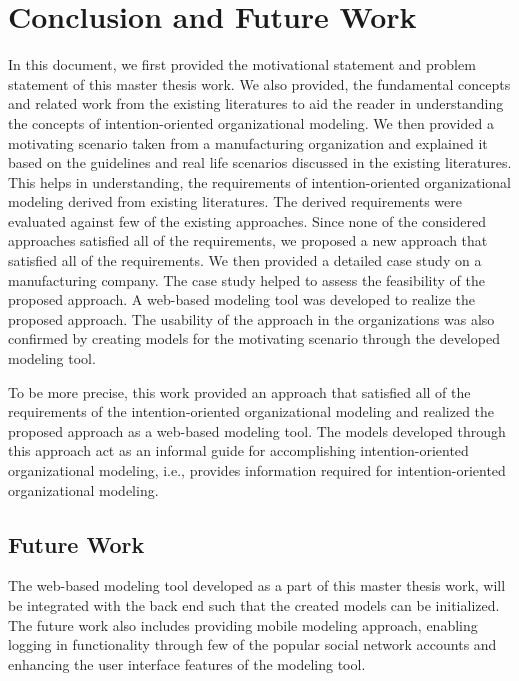 \chapter{Conclusion and Future Work}
\label{chap:conclusion}

In this document, we first provided the motivational statement and problem statement of this master thesis work. We also provided, the fundamental concepts and related work from the existing literatures to aid the reader in understanding the concepts of intention-oriented organizational modeling. We then provided a motivating scenario taken from a manufacturing organization and explained it based on the guidelines and real life scenarios discussed in the existing literatures. This helps in understanding, the requirements of intention-oriented organizational modeling derived from existing literatures. The derived requirements were evaluated against few of the existing approaches. Since none of the considered approaches satisfied all of the requirements, we proposed a new approach that satisfied all of the requirements. We then provided a detailed case study on a manufacturing company. The case study helped to assess the feasibility of the proposed approach. A web-based modeling tool was developed to realize the proposed approach. The usability of the approach in the organizations was also confirmed by creating models for the motivating scenario through the developed modeling tool.  

To be more precise, this work provided an approach that satisfied all of the requirements of the intention-oriented organizational modeling and realized the proposed approach as a web-based modeling tool. The models developed through this approach act as an informal guide for accomplishing intention-oriented organizational modeling, i.e., provides information required for intention-oriented organizational modeling. 

\section*{Future Work}
\label{sec:futurework}
The web-based modeling tool developed as a part of this master thesis work, will be integrated with the back end such that the created models can be initialized. The future work also includes providing mobile modeling approach, enabling logging in functionality through few of the popular social network accounts and enhancing the user interface features of the modeling tool. 





